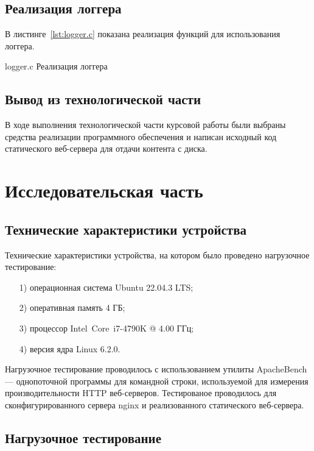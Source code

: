 \documentclass{bmstu}
\begin{document}
\section{Реализация логгера}

В листинге~\ref{lst:logger.c} показана реализация функций для использования логгера.

	{logger.c}
	{Реализация логгера}

\section*{Вывод из технологической части}

В ходе выполнения технологической части курсовой работы были выбраны средства реализации программного обеспечения и написан исходный код статического веб-сервера для отдачи контента с диска.

\chapter{Исследовательская часть}

\section{Технические характеристики устройства}

Технические характеристики устройства, на котором было проведено нагрузочное тестирование:

\begin{enumerate}
\item[1)]
операционная система Ubuntu 22.04.3 LTS;
\item[2)]
оперативная память 4 ГБ;
\item[3)]
процессор Intel\textregistered ~Core\texttrademark ~i7-4790K @ 4.00 ГГц;
\item[4)] версия ядра Linux 6.2.0.
\end{enumerate}

Нагрузочное тестирование проводилось с использованием утилиты ApacheBench --- однопоточной программы для командной строки, используемой для измерения производительности HTTP веб-серверов. 
Тестированое проводилось для сконфигурированного сервера nginx и реализованного статического веб-сервера.

\section{Нагрузочное тестирование}
\end{document}
